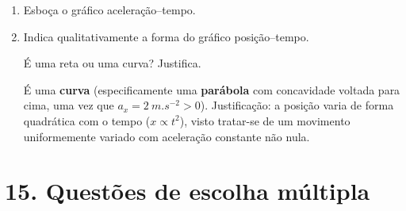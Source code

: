 \documentclass[11pt,a4paper]{article}
\begin{document}
\begin{enumerate}[label=\textbf{\arabic*.},resume]
		\item Esboça o gráfico aceleração--tempo.
		
		\begin{solucao}
			\begin{center}
			\end{center}
		\end{solucao}
		
		\item Indica qualitativamente a forma do gráfico posição--tempo.
		
		É uma reta ou uma curva? Justifica.
		
		\begin{solucao}
			É uma \textbf{curva} (especificamente uma \textbf{parábola} com concavidade voltada para cima, uma vez que $a_x = \SI{+2}{m.s^{-2}} > 0$). Justificação: a posição varia de forma quadrática com o tempo ($x \propto t^2$), visto tratar-se de um movimento uniformemente variado com aceleração constante não nula.
		\end{solucao}
		
	\end{enumerate}
	
	\section*{15. Questões de escolha múltipla}
	
\end{document}
